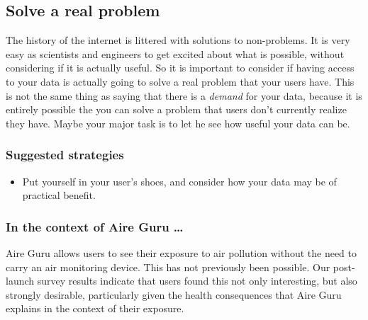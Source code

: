 \subsection{Solve a real problem}

The history of the internet is littered with solutions to non-problems.
It is very easy as scientists and engineers to get excited about what is possible, without considering if it is actually
useful. So it is important to consider if having access to your data is actually going to solve a real problem that your
users have. This is not the same thing as saying that there is a \emph{demand} for your data, because it is entirely possible 
the you can solve a problem that users don't currently realize they have.
Maybe your major task is to let he see how useful your data can be.\\

\subsubsection*{Suggested strategies} 

\begin{itemize}
    \item Put yourself in your user's shoes, and consider how your data may be of practical benefit.
\end{itemize}

\subsubsection*{In the context of Aire Guru \ldots} 

Aire Guru allows users to see their exposure to air pollution without the need to carry an air monitoring device.
This has not previously been possible. 
Our post-launch survey results indicate that users found this not only interesting, but also strongly desirable, 
particularly given the health consequences that Aire Guru explains in the context of their exposure.\\

